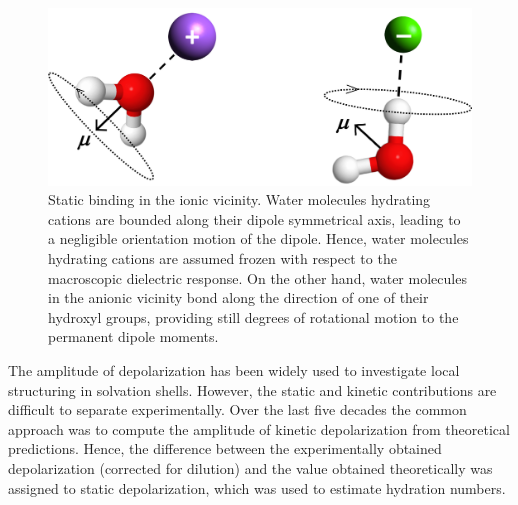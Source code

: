 \begin{figure}[t!]
	\centering
	\includegraphics[width=0.7\figwidth]{chapters/Chapter2_Methods/Graphics/BindingIons.png}
	\caption{Static binding in the ionic vicinity. Water molecules hydrating cations are bounded along their dipole symmetrical axis, leading to a negligible orientation motion of the dipole. Hence, water molecules hydrating cations are assumed frozen with respect to the macroscopic dielectric response. On the other hand, water molecules in the anionic vicinity bond along the direction of one of their hydroxyl groups, providing still degrees of rotational motion to the permanent dipole moments.}
	\label{BindingIons}
\end{figure}



The amplitude of depolarization has been widely used to investigate local structuring in solvation shells. However, the static and kinetic contributions are difficult to separate experimentally.\!\cite{Cota2018} Over the last five decades the common approach was to compute the amplitude of kinetic depolarization from theoretical predictions. Hence, the difference between the experimentally obtained depolarization (corrected for dilution) and the value obtained theoretically was assigned to static depolarization, which was used to estimate hydration numbers.\!\cite{Buchner1999,Buchner1999c,Chen2003,Tielrooij2009,Buchner2008,Ensing2013,Sega2014,Ottosson2014c}





